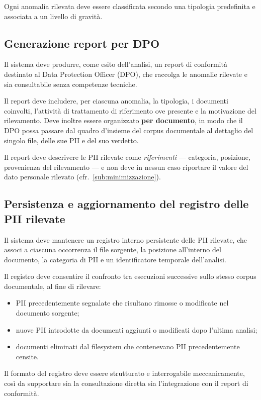 Ogni anomalia rilevata deve essere classificata secondo una tipologia predefinita e associata a un livello di gravità.

\subsection{Generazione report per DPO}
\label{sub:generazione-report}
Il sistema deve produrre, come esito dell'analisi, un report di conformità destinato al Data Protection Officer (DPO), che raccolga le anomalie rilevate e sia consultabile senza competenze tecniche. \medskip

Il report deve includere, per ciascuna anomalia, la tipologia, i documenti coinvolti, l'attività di trattamento di riferimento ove presente e la motivazione del rilevamento. Deve inoltre essere organizzato \textbf{per documento}, in modo che il DPO possa passare dal quadro d'insieme del corpus documentale al dettaglio del singolo file, delle sue PII e del suo verdetto. \medskip

Il report deve descrivere le PII rilevate come \textit{riferimenti} --- categoria, posizione, provenienza del rilevamento --- e non deve in nessun caso riportare il valore del dato personale rilevato (cfr.~\ref{sub:minimizzazione}).

\subsection{Persistenza e aggiornamento del registro delle PII rilevate}
\label{sub:registro-pii}
Il sistema deve mantenere un registro interno persistente delle PII rilevate, che associ a ciascuna occorrenza il file sorgente, la posizione all'interno del documento, la categoria di PII e un identificatore temporale dell'analisi. \medskip

Il registro deve consentire il confronto tra esecuzioni successive sullo stesso corpus documentale, al fine di rilevare:
\begin{itemize}
	\item PII precedentemente segnalate che risultano rimosse o modificate nel documento sorgente;
	\item nuove PII introdotte da documenti aggiunti o modificati dopo l'ultima analisi;
	\item documenti eliminati dal filesystem che contenevano PII precedentemente censite.
\end{itemize} \medskip

Il formato del registro deve essere strutturato e interrogabile meccanicamente, così da supportare sia la consultazione diretta sia l'integrazione con il report di conformità.

